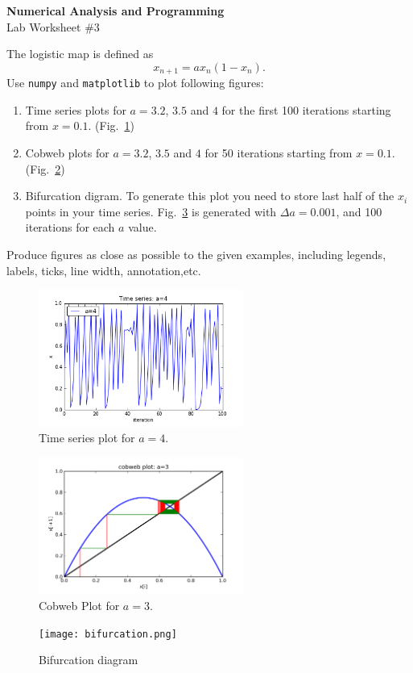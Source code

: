\documentclass[12pt]{article}
\begin{document}
\begin{center}
\Large
\textbf{Numerical Analysis and Programming}\\
\large
Lab Worksheet \#3
\end{center}

The logistic map is defined as 
\[
x_{n+1}=a x_n(1-x_n).
\]
Use \verb!numpy! and \verb!matplotlib! to plot following figures:

\begin{enumerate}
\item Time series plots for $a=3.2$, $3.5$ and $4$ for the first 100 iterations starting from $x=0.1$.  (Fig.~\ref{timeseries})
\item Cobweb plots for $a=3.2$, $3.5$ and $4$ for 50 iterations starting from $x=0.1$. (Fig.~\ref{cobweb})

\item Bifurcation digram. To generate this plot you need to store last half of the $x_i$ points in your time series.  Fig.~\ref{bifurcation} is generated with $\Delta a=0.001$, and 100 iterations for each $a$ value. 

\end{enumerate}
Produce figures as close as possible to the given examples, including legends, labels, ticks, line width, annotation,etc.

\begin{figure}[ht]
\centerline{\includegraphics[width=0.6\textwidth]{timeseries_a4.png}}
\caption{Time series plot  for $a=4$.}
\label{timeseries}
\end{figure}

\begin{figure}[h]
\centerline{\includegraphics[width=0.6\textwidth]{cobweb_a3.png}}
\caption{Cobweb Plot for $a=3$.}
\label{cobweb}
\end{figure}


\begin{figure}[hb]
\centerline{\texttt{[image: bifurcation.png]}}
\caption{Bifurcation diagram}
\label{bifurcation}
\end{figure}
\end{document}
